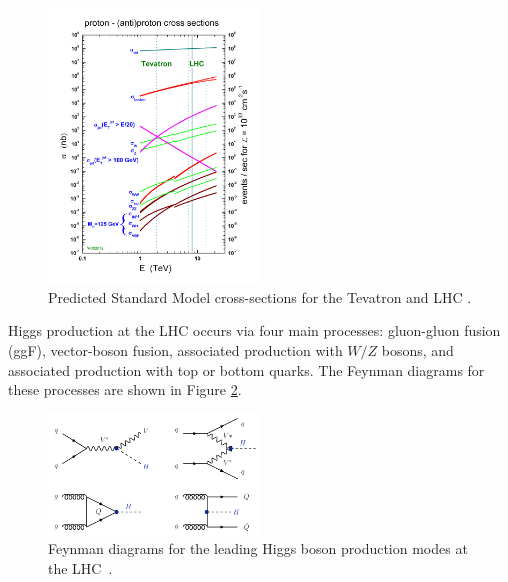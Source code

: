 \begin{figure}[H]
        \centering
    \includegraphics[width=0.5\textwidth] {Pictures/crosssections.jpg}\hspace{1cm}
    \caption{Predicted Standard Model cross-sections for the Tevatron and LHC \cite{Stirling}.}
    \label{fig:crosssection}
\end{figure}

Higgs production at the LHC occurs via four main processes: gluon-gluon fusion (ggF), vector-boson fusion, associated production with $W/Z$ bosons, and associated production with top or bottom quarks. The Feynman diagrams for these processes are shown in Figure \ref{fig:FeynmannHiggs}.  

\begin{figure}[H]
        \centering
    \includegraphics[width=0.5\textwidth] {Pictures/FeynmannHiggs.png}\hspace{1cm}
    \caption{Feynman diagrams for the leading Higgs boson production modes at the LHC~\cite{Djouadi}.}
    \label{fig:FeynmannHiggs}
\end{figure}

